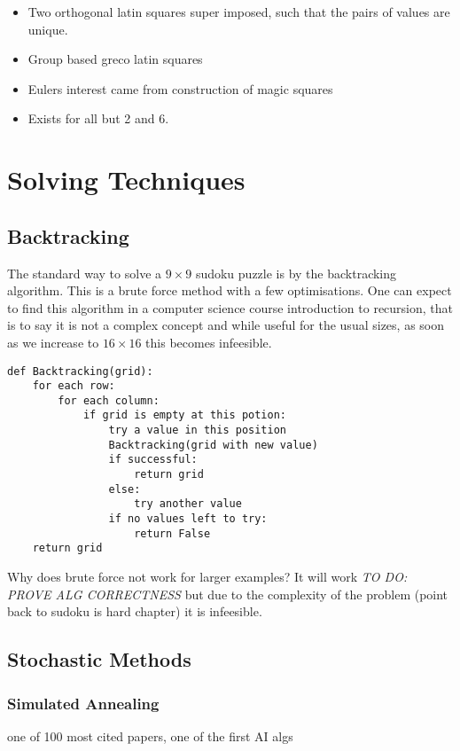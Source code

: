 \documentclass[a4paper,12pt]{article}
\begin{document}
		\begin{itemize}
		\item{Two orthogonal latin squares super imposed, such that the pairs of values are unique.}
		\item{Group based greco latin squares}
		\item{Eulers interest came from construction of magic squares}
		\item{Exists for all but 2 and 6.}
		\end{itemize}
\section{Solving Techniques}
\subsection{Backtracking}
The standard way to solve a $9 \times 9$ sudoku puzzle is by the backtracking algorithm. This is a brute force method with a few optimisations. One can expect to find this algorithm in a computer science course introduction to recursion, that is to say it is not a complex concept and while useful for the usual sizes, as soon as we increase to $16 \times 16$ this becomes infeesible. 
\begin{lstlisting}[caption=Backtracking]
def Backtracking(grid):
    for each row:
        for each column:
            if grid is empty at this potion:
                try a value in this position
                Backtracking(grid with new value)
                if successful:
                    return grid
                else:
                    try another value
                if no values left to try:
                    return False
    return grid						
\end{lstlisting}
Why does brute force not work for larger examples? It will work \textit{TO DO: PROVE ALG CORRECTNESS} but due to the complexity of the problem (point back to sudoku is hard chapter) it is infeesible.
\subsection{Stochastic Methods}
\subsubsection{Simulated Annealing} 
\cite{simulated annealing} one of 100 most cited papers, one of the first AI algs
\end{document}
